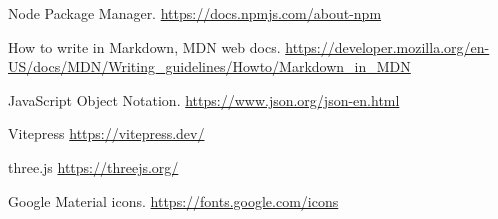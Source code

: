 \documentclass[letterpaper,11pt]{article}
\begin{document}
{\begin{thebibliography}{99}
 Node Package Manager. \url{https://docs.npmjs.com/about-npm}

 How to write in Markdown, MDN web docs. \url{https://developer.mozilla.org/en-US/docs/MDN/Writing_guidelines/Howto/Markdown_in_MDN}

 JavaScript Object Notation. \url{https://www.json.org/json-en.html}

 Vitepress \url{https://vitepress.dev/}

 three.js \url{https://threejs.org/}

 Google Material icons. \url{https://fonts.google.com/icons}



\end{thebibliography}
} %
   
\end{document}
